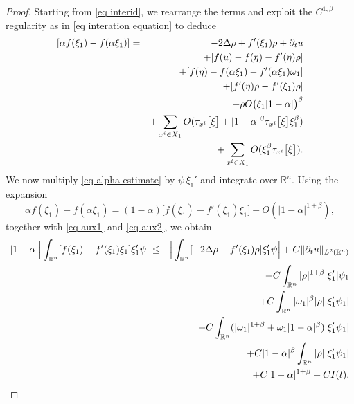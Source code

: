 \documentclass[11pt,letterpaper,reqno]{amsart}
\newcommand{\R}{\mathbb{R}}
\theoremstyle{plain}%
\theoremstyle{definition}
\numberwithin{equation}{section}
\numberwithin{figure}{section}
\begin{document}
\begin{proof}
Starting from \eqref{eq interid}, we rearrange the terms and exploit the  $C^{1,\beta}$ regularity as in \eqref{eq interation equation} to deduce
\begin{eqnarray}\notag
[\alpha f(\xi_1)- f(\alpha \xi_1)]&=&- 2 \Delta \rho+f'(\xi_1) \rho + \partial_t u  \\\notag
	&&+[f(u)-f(\eta)-f'(\eta)\rho]\\\notag
	&&+ [f(\eta)-f(\alpha\xi_1)-f'( \alpha\xi_1)\omega_1]\\\notag
	&&+ [f'(\eta)\rho-f'(\xi_1)\rho]\\\notag
    &&+ \rho O\big(\xi_1|1-\alpha|\big)^\beta\\ \notag
	&&+ \sum_{x^i \in X_1}O(\tau_{x^i}\big[\xi\big]+|1-\alpha|^\beta\tau_{x^i}\big[\xi\big]\xi_1^\beta)\\ \label{eq alpha estimate}
   && +\sum_{x^i \in X_1}  O(\xi_1^\beta\tau_{x^i}\big[\xi\big]).
\end{eqnarray}
We now multiply \eqref{eq alpha estimate} by $\psi\,\xi_1'$ and integrate over $\R^n$. 
Using the expansion
\[
\alpha f(\xi_1)-f(\alpha \xi_1)
=
(1-\alpha)\big[f(\xi_1)-f'(\xi_1)\xi_1\big]
+
O(|1-\alpha|^{1+\beta}),
\]
together with \eqref{eq aux1} and \eqref{eq aux2}, we obtain
\begin{eqnarray}\notag
|1-\alpha|\Big| \int_{\R^n}[f(\xi_1)-f'(\xi_1)\xi_1] \xi_1' \psi \Big| &\leq & \Big|\int_{\R^n} [- 2 \Delta \rho+f'(\xi_1) \rho] \xi_1' \psi \Big| + C\Vert\partial_t u\Vert_{L^2(\R^n)} \\\notag
	&&+C\int_{\R^n} |\rho|^{1+\beta}  |\xi_1'| \psi_1\\\notag
	&&+C\int_{\R^n} |\omega_{1}|^{\beta}|\rho|| \xi_1'\psi_1|\\\notag
	&&+ C\int_{\R^n}(|\omega_1|^{1+\beta}+\omega_1|1-\alpha|^\beta)| \xi_1' \psi_1|\\ \notag
    &&+  C|1-\alpha|^\beta\int_{\R^n} |\rho| | \xi_1' \psi_1|\\ \label{eq alpha2ndbound} 
	&&+C|1-\alpha|^{1+\beta}+ CI(t).
\end{eqnarray}


\end{proof}
\end{document}
